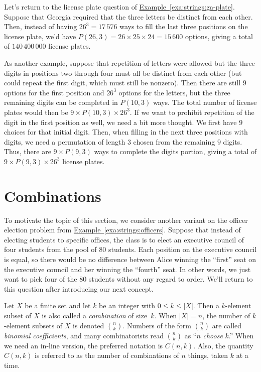 \begin{example}
  Let's return to the license plate question of
  \hyperref[exa:strings:ga-plate]{Example~\ref*{exa:strings:ga-plate}}. Suppose
  that Georgia required that the three letters be distinct from each
  other. Then, instead of having $26^3=17\,576$ ways to fill the last three
  positions on the license plate, we'd have $P(26,3) = 26\times
  25\times 24 = 15\,600$ options, giving a total of $140\,400\,000$
  license plates. 

  As another example, suppose that repetition of letters were allowed
  but the three digits in positions two through four must all be
  distinct from each other (but could repeat the first digit, which
  must still be nonzero). Then there are still $9$ options for the
  first position and $26^3$ options for the letters, but the three
  remaining digits can be completed in $P(10,3)$ ways. The total
  number of license plates would then be $9\times P(10,3)\times
  26^3$. If we want to prohibit repetition of the digit in the first
  position as well, we need a bit more thought. We first have $9$
  choices for that initial digit. Then, when filling in the next three
  positions with digits, we need a permutation of length $3$ chosen
  from the remaining $9$ digits. Thus, there are $9\times P(9,3)$ ways
  to complete the digits portion, giving a total of $9\times
  P(9,3)\times 26^3$ license plates.
\end{example}

\section{Combinations}\label{s:strings:combinations}

To motivate the topic of this section, we consider another variant on
the officer election problem from
\hyperref[exa:strings:officers]{Example~\ref*{exa:strings:officers}}. Suppose
that instead of electing students to specific offices, the class is to
elect an executive council of four students from the pool of $80$
students. Each position on the executive council is equal,
so there would be no difference between Alice winning the ``first''
seat on the executive council and her winning the ``fourth'' seat. In
other words, we just want to pick four of the $80$ students without
any regard to order. We'll return to this question after introducing
our next concept.

Let $X$ be a finite set and let $k$ be an integer with $0\le k\le
|X|$.  Then a $k$-element subset of $X$ is also called a
\textit{combination} of size~$k$.  When $|X| =n$, the number of
$k$-element subsets of $X$ is denoted $\binom{n}{k}$.  Numbers of the
form $\binom{n}{k}$ are called \textit{binomial coefficients}, and
many combinatorists read $\binom{n}{k}$ as ``$n$ \textit{choose} $k$.''
When we need an in-line version, the preferred notation is $C(n,k)$.
Also, the quantity $C(n,k)$ is referred to as the number of
combinations of $n$ things, taken $k$ at a time.

